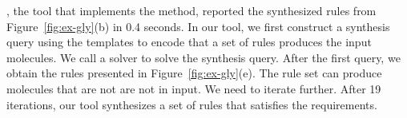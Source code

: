 \ourtool, the tool that implements the method, reported the synthesized rules from
Figure~\ref{fig:ex-gly}(b) in 0.4 seconds.
In our tool, we first construct a synthesis query using the templates to encode
that a set of rules produces the input molecules.
We call a solver to solve the synthesis query.
After the first query, we obtain the rules presented in Figure~\ref{fig:ex-gly}(e).
The rule set can produce molecules that are not are not in input.
We need to iterate further.
After 19 iterations, our tool synthesizes a set of rules that
satisfies the requirements.



